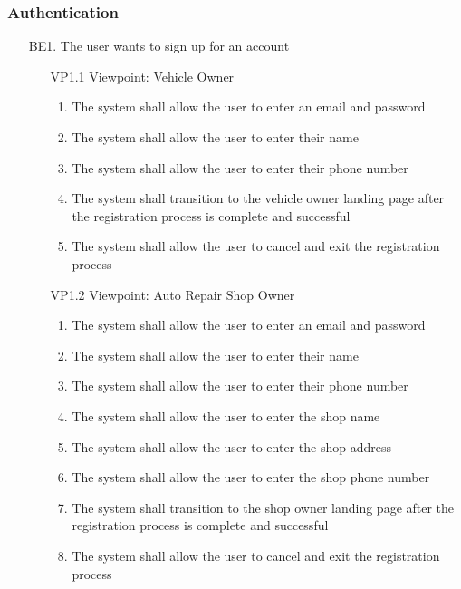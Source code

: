 \documentclass[12pt]{article}
\begin{document}
\subsubsection{Authentication}
\begin{enumerate}
	\item [{BE}1.] The user wants to sign up for an account
	      \begin{enumerate}
		      \item [{VP1}.1] Viewpoint: Vehicle Owner
		            \begin{enumerate}
			            \item The system shall allow the user to enter an email and password
			            \item The system shall allow the user to enter their name
			            \item The system shall allow the user to enter their phone number
			            \item The system shall transition to the vehicle owner landing page after the registration process is
			                  complete and successful
			            \item The system shall allow the user to cancel and exit the registration process
		            \end{enumerate}
	      \end{enumerate}
	      \begin{enumerate}
		      \item [{VP1}.2] Viewpoint: Auto Repair Shop Owner
		            \begin{enumerate}
			            \item The system shall allow the user to enter an email and password
			            \item The system shall allow the user to enter their name
			            \item The system shall allow the user to enter their phone number
			            \item The system shall allow the user to enter the shop name
			            \item The system shall allow the user to enter the shop address
			            \item The system shall allow the user to enter the shop phone number
			            \item The system shall transition to the shop owner landing page after the registration process is
			                  complete and successful
			            \item The system shall allow the user to cancel and exit the registration process

\end{enumerate}
\end{enumerate}
\end{enumerate}
\end{document}
